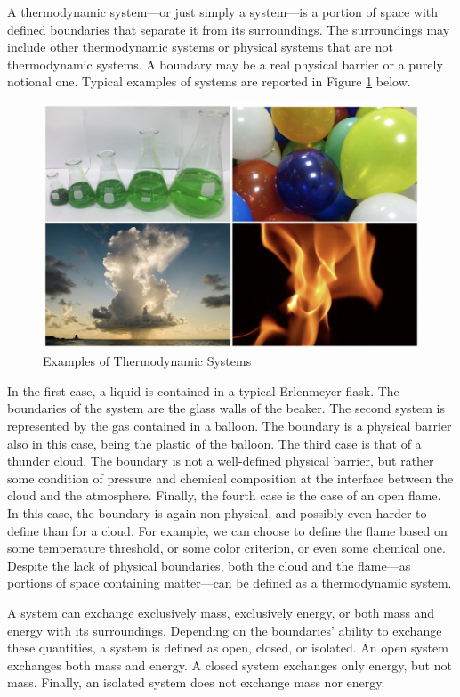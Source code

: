 \documentclass[
]{book}
\theoremstyle{definition}
\theoremstyle{definition}
\theoremstyle{definition}
\theoremstyle{remark}
\begin{document}
A thermodynamic system---or just simply a system---is a portion of space with defined boundaries that separate it from its surroundings. The surroundings may include other thermodynamic systems or physical systems that are not thermodynamic systems. A boundary may be a real physical barrier or a purely notional one. Typical examples of systems are reported in Figure \ref{fig:Fig1c1} below.

\begin{figure}

{\centering \includegraphics[width=0.8\linewidth]{./img/OEP_Figures.001} 

}

\caption{Examples of Thermodynamic Systems}\label{fig:Fig1c1}
\end{figure}

In the first case, a liquid is contained in a typical Erlenmeyer flask. The boundaries of the system are the glass walls of the beaker. The second system is represented by the gas contained in a balloon. The boundary is a physical barrier also in this case, being the plastic of the balloon. The third case is that of a thunder cloud. The boundary is not a well-defined physical barrier, but rather some condition of pressure and chemical composition at the interface between the cloud and the atmosphere. Finally, the fourth case is the case of an open flame. In this case, the boundary is again non-physical, and possibly even harder to define than for a cloud. For example, we can choose to define the flame based on some temperature threshold, or some color criterion, or even some chemical one. Despite the lack of physical boundaries, both the cloud and the flame---as portions of space containing matter---can be defined as a thermodynamic system.

A system can exchange exclusively mass, exclusively energy, or both mass and energy with its surroundings. Depending on the boundaries' ability to exchange these quantities, a system is defined as open, closed, or isolated. An open system exchanges both mass and energy. A closed system exchanges only energy, but not mass. Finally, an isolated system does not exchange mass nor energy.
\end{document}
